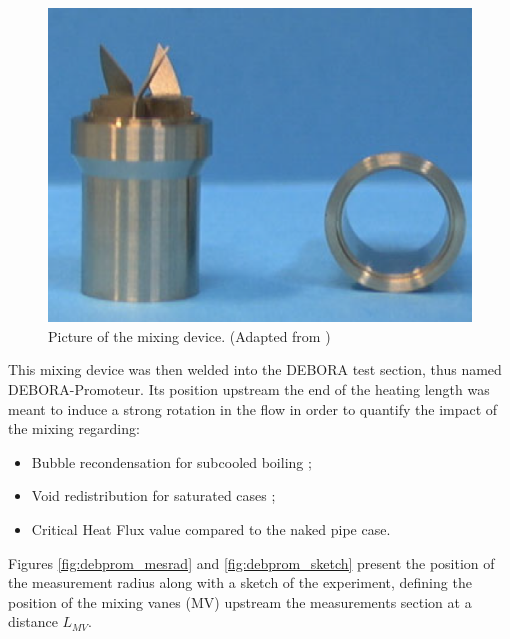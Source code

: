 \begin{figure}[!h]
\centering
\includegraphics[width=0.3\linewidth]{img/DEBORA-Promoteur/prom_pic2.png}
\caption{Picture of the mixing device. (Adapted from \cite{falk_promoteur_2007})}
\label{fig:debprom_vanes}
\end{figure}

\npar

This mixing device was then welded into the DEBORA test section, thus named DEBORA-Promoteur. Its position upstream the end of the heating length was meant to induce a strong rotation in the flow in order to quantify the impact of the mixing regarding:

\begin{itemize}
\item Bubble recondensation for subcooled boiling ;
\item Void redistribution for saturated cases ;
\item Critical Heat Flux value compared to the naked pipe case.
\end{itemize}

Figures \ref{fig:debprom_mesrad} and \ref{fig:debprom_sketch} present the position of the measurement radius along with a sketch of the experiment, defining the position of the mixing vanes (MV) upstream the measurements section at a distance $L_{MV}$.




